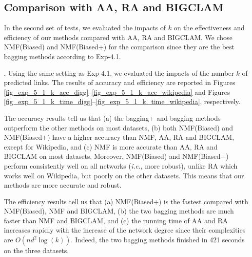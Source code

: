 \documentclass[10pt,journal,compsoc]{IEEEtran}
\newcommand{\stitle}[1]{\vspace{0.5ex}\noindent{\bf #1}}
\newcommand{\NMF}{{\sf NMF}\xspace }
\newcommand{\Biased}{{\sf NMF(Biased)}\xspace}
\newcommand{\Aa}{{\sf AA}\xspace }
\newcommand{\RA}{{\sf RA}\xspace }
\newcommand{\BIGCLAM}{{\sf BIGCLAM}\xspace}
\newcommand{\Digg}{{\sf Digg}\xspace}
\newcommand{\YouTube}{{\sf YouTube}\xspace}
\newcommand{\Wikipedia}{{\sf Wikipedia}\xspace}
\newcommand{\Biasedp}{{\sf NMF(Biased+)}\xspace}
\newcommand{\ie}{\emph{i.e.,}\xspace}
\newcommand{\resp}{\emph{resp.}\xspace}
\begin{document}
\subsection{Comparison with \Aa, \RA and \BIGCLAM}
In the second set of tests, we evaluated the impacts of $k$ on the
effectiveness and efficiency of
our methods compared with \Aa, \RA and \BIGCLAM. We chose \Biased and \Biasedp
for the comparison since they are the best bagging methods according to Exp-4.1.



\stitle{Exp-5.1: Impacts of $k$}. Using the same setting as
Exp-4.1, we evaluated the impacts of the number $k$ of predicted links.
The results of accuracy and  efficiency  are reported
in Figures \ref{fig_exp_5_1_k_acc_digg}--\ref{fig_exp_5_1_k_acc_wikipedia} and
Figures \ref{fig_exp_5_1_k_time_digg}--\ref{fig_exp_5_1_k_time_wikipedia}, respectively.

The accuracy results tell us that (a) the bagging+ and bagging methods outperform the other methods on
most datasets, (b) both \Biased and \Biasedp have a higher accuracy than
\NMF, \Aa, \RA and \BIGCLAM, except for \Wikipedia,
and (c) \NMF is more accurate than \Aa, \RA and \BIGCLAM on most datasets.
Moreover, \Biased and \Biasedp perform consistently well on all networks (\ie more robust),
unlike \RA which works well on \Wikipedia, but poorly on the other datasets.
This means that our methods are more accurate and robust.



The  efficiency results tell us that (a) \Biasedp is the fastest compared with
\Biased, \NMF and \BIGCLAM, (b) the two bagging methods are much faster
than \NMF and \BIGCLAM, and (c) the running time of \Aa and \RA increases
rapidly with the increase of the network degree since their complexities
are $O(nd^2\log(k))$. Indeed, the two bagging methods finished in 421 seconds on the three datasets.
\end{document}
